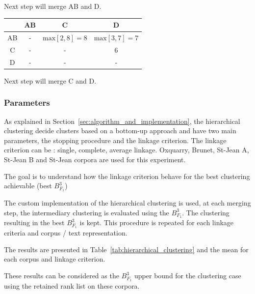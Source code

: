 \begin{example}
  \vspace{0.2cm}
  Next step will merge AB and D.

  \vspace{0.5cm}

  \begin{subexample}{\linewidth}
    \centering
    \begin{tabular}{c|c c c}
      \toprule
        & AB & C & D \\
      \midrule
      AB & - & $\text{max} \left[2, 8 \right] = 8$ & $\text{max} \left[3, 7 \right] = 7$ \\
      C  & - & - & 6 \\
      D  & - & - & - \\
      \bottomrule
    \end{tabular}
  \end{subexample}

  \vspace{0.2cm}
  Next step will merge C and D.
\end{example}


\subsubsection{Parameters\label{sec:hierarchical_clustering}}

As explained in Section~\ref{sec:algorithm_and_implementation}, the hierarchical clustering decide clusters based on a bottom-up approach and have two main parameters, the stopping procedure and the linkage criterion.
The linkage criterion can be : single, complete, average linkage.
Oxquarry, Brunet, St-Jean A, St-Jean B and St-Jean corpora are used for this experiment.

The goal is to understand how the linkage criterion behave for the best clustering achievable (best $B^3_{F_1}$)

The custom implementation of the hierarchical clustering is used, at each merging step, the intermediary clustering is evaluated using the $B^3_{F_1}$.
The clustering resulting in the best $B^3_{F_1}$ is kept.
This procedure is repeated for each linkage criteria and corpus / text representation.

The results are presented in Table~\ref{tab:hierarchical_clustering} and the mean for each corpus and linkage criterion.

These results can be considered as the $B^3_{F_1}$ upper bound for the clustering case using the retained rank list on these corpora.

